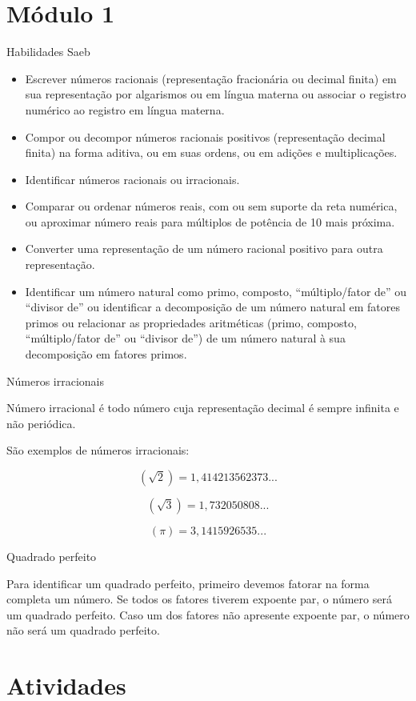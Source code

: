 \section{Módulo 1}

Habilidades Saeb

\begin{itemize}
\item
  Escrever números racionais (representação fracionária ou decimal
  finita) em sua representação por algarismos ou em língua materna ou
  associar o registro numérico ao registro em língua materna.
\item
  Compor ou decompor números racionais positivos (representação decimal
  finita) na forma aditiva, ou em suas ordens, ou em adições e
  multiplicações.
\item
  Identificar números racionais ou irracionais.
\item
  Comparar ou ordenar números reais, com ou sem suporte da reta
  numérica, ou aproximar número reais para múltiplos de potência de 10
  mais próxima.
\item
  Converter uma representação de um número racional positivo para outra
  representação.
\item
  Identificar um número natural como primo, composto, ``múltiplo/fator
  de'' ou ``divisor de'' ou identificar a decomposição de um número
  natural em fatores primos ou relacionar as propriedades aritméticas
  (primo, composto, ``múltiplo/fator de'' ou ``divisor de'') de um
  número natural à sua decomposição em fatores primos.
\end{itemize}

Números irracionais

Número irracional é todo número cuja representação decimal é sempre
infinita e não periódica.

São exemplos de números irracionais:

$$(\sqrt{2})=1,414213562373...$$

$$(\sqrt{3}) = 1,732050808...$$

$$(\pi) = 3,1415926535...$$

Quadrado perfeito

Para identificar um quadrado perfeito, primeiro devemos fatorar na forma
completa um número. Se todos os fatores tiverem expoente par, o número
será um quadrado perfeito. Caso um dos fatores não apresente expoente
par, o número não será um quadrado perfeito.

\section{Atividades}

